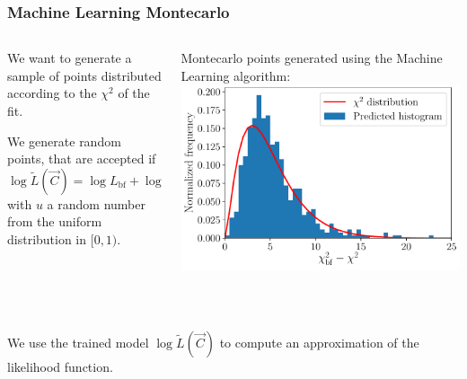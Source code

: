 \documentclass[mathserif, 10pt, dvipsnames]{beamer}
\begin{document}
\begin{frame}\frametitle{Machine Learning Montecarlo}
    \begin{columns}
        \begin{column}{0.5\textwidth}
            We want to generate a sample of points distributed according to the $\chi^2$ of the fit.

            We generate random points, that are accepted if
            $$\log \tilde{L}(\vec{C}) = \log L_\mathrm{bf} + \log u\,,$$
            with $u$ a random number from the uniform distribution in $[0,1)$. %
        \end{column}
        \begin{column}{0.5\textwidth}
            {\small Montecarlo points generated using the
                Machine Learning algorithm:}\\[0.2em]
            \includegraphics[width=\columnwidth]{figures/hist_xgb.pdf}
        \end{column}
    \end{columns}

    ~

    We use the trained model $\log\tilde{L}(\vec{C})$ to compute an approximation of the likelihood function.

\end{frame}
\end{document}
